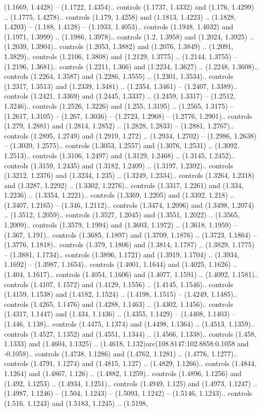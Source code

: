 (1.1669, 1.4428) -- (1.1722, 1.4354).. controls (1.1737, 1.4332) and (1.176, 1.4299) .. (1.1775, 1.4278).. controls (1.179, 1.4258) and (1.1813, 1.4223) .. (1.1828, 1.4203) -- (1.188, 1.4128) -- (1.1933, 1.4053).. controls (1.1948, 1.4032) and (1.1971, 1.3999) .. (1.1986, 1.3978).. controls (1.2, 1.3958) and (1.2024, 1.3925) .. (1.2039, 1.3904).. controls (1.2053, 1.3882) and (1.2076, 1.3849) .. (1.2091, 1.3829).. controls (1.2106, 1.3808) and (1.2129, 1.3775) .. (1.2144, 1.3755) -- (1.2196, 1.3681).. controls (1.2211, 1.366) and (1.2234, 1.3627) .. (1.2248, 1.3608).. controls (1.2264, 1.3587) and (1.2286, 1.3555) .. (1.2301, 1.3534).. controls (1.2317, 1.3513) and (1.2339, 1.3481) .. (1.2354, 1.3461) -- (1.2407, 1.3389).. controls (1.2421, 1.3369) and (1.2445, 1.3337) .. (1.2459, 1.3317) -- (1.2512, 1.3246).. controls (1.2526, 1.3226) and (1.255, 1.3195) .. (1.2565, 1.3175) -- (1.2617, 1.3105) -- (1.267, 1.3036) -- (1.2723, 1.2968) -- (1.2776, 1.2901).. controls (1.279, 1.2881) and (1.2814, 1.2852) .. (1.2828, 1.2833) -- (1.2881, 1.2767).. controls (1.2895, 1.2749) and (1.2919, 1.272) .. (1.2934, 1.2702) -- (1.2986, 1.2638) -- (1.3039, 1.2575).. controls (1.3053, 1.2557) and (1.3076, 1.2531) .. (1.3092, 1.2513).. controls (1.3106, 1.2497) and (1.3129, 1.2468) .. (1.3145, 1.2452).. controls (1.3159, 1.2435) and (1.3182, 1.2409) .. (1.3197, 1.2392).. controls (1.3212, 1.2376) and (1.3234, 1.235) .. (1.3249, 1.2334).. controls (1.3264, 1.2318) and (1.3287, 1.2292) .. (1.3302, 1.2276).. controls (1.3317, 1.2261) and (1.334, 1.2236) .. (1.3354, 1.2221).. controls (1.3369, 1.2205) and (1.3392, 1.218) .. (1.3407, 1.2165) -- (1.346, 1.2112).. controls (1.3474, 1.2096) and (1.3498, 1.2074) .. (1.3512, 1.2059).. controls (1.3527, 1.2045) and (1.3551, 1.2022) .. (1.3565, 1.2009).. controls (1.3579, 1.1994) and (1.3603, 1.1972) .. (1.3618, 1.1959) -- (1.367, 1.191).. controls (1.3685, 1.1897) and (1.3709, 1.1876) .. (1.3723, 1.1864) -- (1.3776, 1.1818).. controls (1.379, 1.1806) and (1.3814, 1.1787) .. (1.3829, 1.1775) -- (1.3881, 1.1734).. controls (1.3896, 1.1721) and (1.3919, 1.1704) .. (1.3934, 1.1692) -- (1.3987, 1.1654).. controls (1.4001, 1.1644) and (1.4025, 1.1626) .. (1.404, 1.1617).. controls (1.4054, 1.1606) and (1.4077, 1.1591) .. (1.4092, 1.1581).. controls (1.4107, 1.1572) and (1.4129, 1.1556) .. (1.4145, 1.1546).. controls (1.4159, 1.1538) and (1.4182, 1.1524) .. (1.4198, 1.1515) -- (1.4249, 1.1485).. controls (1.4265, 1.1476) and (1.4288, 1.1463) .. (1.4302, 1.1456).. controls (1.4317, 1.1447) and (1.434, 1.1436) .. (1.4355, 1.1429) -- (1.4408, 1.1403) -- (1.446, 1.138).. controls (1.4475, 1.1374) and (1.4498, 1.1364) .. (1.4513, 1.1359).. controls (1.4527, 1.1352) and (1.4551, 1.1344) .. (1.4566, 1.1338).. controls (1.458, 1.1333) and (1.4604, 1.1325) .. (1.4618, 1.132)arc(108.8147:102.8858:0.1058 and -0.1058).. controls (1.4738, 1.1286) and (1.4762, 1.1281) .. (1.4776, 1.1277).. controls (1.4791, 1.1274) and (1.4815, 1.127) .. (1.4829, 1.1266).. controls (1.4844, 1.1264) and (1.4867, 1.126) .. (1.4882, 1.1259).. controls (1.4896, 1.1256) and (1.492, 1.1253) .. (1.4934, 1.1251).. controls (1.4949, 1.125) and (1.4973, 1.1247) .. (1.4987, 1.1246) -- (1.504, 1.1243) -- (1.5093, 1.1242) -- (1.5146, 1.1243).. controls (1.516, 1.1243) and (1.5183, 1.1245) .. (1.5198, 